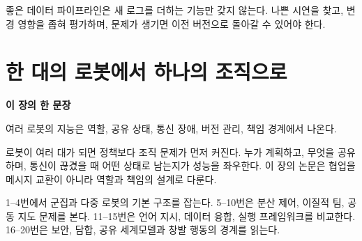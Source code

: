 \documentclass[11pt,openany]{book}
\newcommand{\chaptertakeaway}[1]{%
  \begin{tcolorbox}[
    breakable,
    colback=deepblue,
    colframe=deepblue,
    coltext=white,
    boxrule=0pt,
    arc=2mm,
    left=5mm,right=5mm,top=4mm,bottom=4mm
  ]
  {\sffamily\bfseries\large 이 장의 한 문장}\par\smallskip
  #1
  \end{tcolorbox}
}
\begin{document}
\begin{translationbox}[이 장을 덮기 전에]

좋은 데이터 파이프라인은 새 로그를 더하는 기능만 갖지 않는다. 나쁜 시연을 찾고, 변경 영향을 좁혀 평가하며, 문제가 생기면 이전 버전으로 돌아갈 수 있어야 한다.

\end{translationbox}

\cleardoublepage

\chapter{한 대의 로봇에서 하나의 조직으로}

\chaptertakeaway{여러 로봇의 지능은 역할, 공유 상태, 통신 장애, 버전 관리, 책임 경계에서 나온다.}

로봇이 여러 대가 되면 정책보다 조직 문제가 먼저 커진다. 누가 계획하고, 무엇을 공유하며, 통신이 끊겼을 때 어떤 상태로 남는지가 성능을 좌우한다. 이 장의 논문은 협업을 메시지 교환이 아니라 역할과 책임의 설계로 다룬다.

\begin{boardbox}[읽는 순서]

1--4번에서 군집과 다중 로봇의 기본 구조를 잡는다. 5--10번은 분산 제어, 이질적 팀, 공동 지도 문제를 본다. 11--15번은 언어 지시, 데이터 융합, 실행 프레임워크를 비교한다. 16--20번은 보안, 담합, 공유 세계모델과 창발 행동의 경계를 읽는다.

\end{boardbox}
\end{document}
